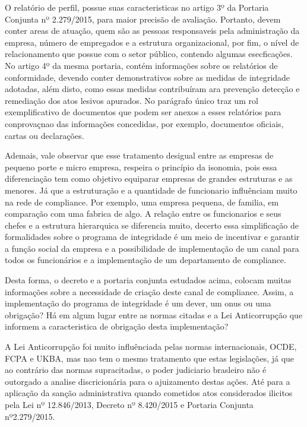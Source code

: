 O relatório de perfil, possue suas caracteristicas no artigo 3º da Portaria Conjunta nº 2.279/2015, para maior precisão de avaliação. Portanto, devem conter areas de atuação, quem são as pessoas responsaveis pela administração da empresa, número de empregados e a estrutura organizacional, por fim, o nível de relacionamento que possue com o setor público, contendo algumas esecficações. No artigo 4º da mesma portaria, contém informações sobre os relatórios de conformidade, devendo conter demonstrativos sobre as medidas de integridade adotadas, além disto, como essas medidas contribuíram ara prevenção detecção e remediação dos atos lesivos apurados. No parágrafo único traz um rol exemplificativo de documentos que podem ser anexos a esses relatórios para conprovaçnao das informações concedidas, por exemplo, documentos oficiais, cartas ou declarações. 

Ademais, vale observar que esse tratamento desigual entre as empresas de pequeno porte e micro empresa, respeira o princípio da isonomia, pois essa diferenciação tem como objetivo equiparar empresas de grandes estruturas e as menores. Já que a estruturação e a quantidade de funcionario influênciam muito na rede de compliance. Por exemplo, uma empresa pequena, de familia, em comparação com uma fabrica de algo. A relação entre os funcionarios e seus chefes e a estrutura hierarquica se diferencia muito, decerto essa simplificação de formalidades sobre o programa de integridade é um meio de incentivar e garantir a função social da empresa e a possibilidade de implementação de um canal para todos os funcionários e a implementação de um departamento de compliance.

Desta forma, o decreto e a portaria conjunta estudados acima, colocam muitas informações sobre a necessidade de criação deste canal de compliance. Assim, a implementação do programa de integridade é um dever, um onus ou uma obrigação? Há em algum lugar entre as normas citadas e a Lei Anticorrupção que informem a caracteristica de obrigação desta implementação?

A Lei Anticorrupção foi muito influênciada pelas normas internacionais, OCDE, FCPA e UKBA, mas nao tem o mesmo tratamento que estas legislações, já que ao contrário das normas supracitadas, o poder judiciario brasleiro não é outorgado a analise discricionária para o ajuizamento destas ações. Até para a aplicação da sanção administrativa quando cometidos atos considerados ilicitos pela Lei nº 12.846/2013, Decreto nº 8.420/2015 e Portaria Conjunta nº2.279/2015. 

